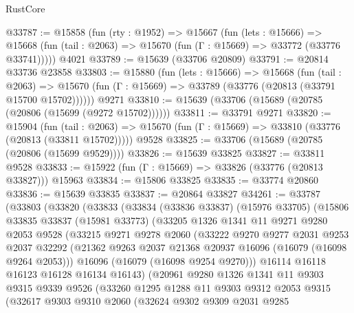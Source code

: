 \begin{lexlean}{RustCore}
\begin{coremodule}
@33787 := @15858
    (fun (rty : @1952) =>
    @15667
      (fun (lets : @15666) =>
      @15668 (fun (tail : @2063) => @15670 (fun (Γ : @15669) => @33772 (@33776 @33741)))))
    @4021
@33789 := @15639 (@33706 @20809)
@33791 := @20814 @33736 @23858
@33803 := @15880
    (fun (lets : @15666) =>
    @15668
      (fun (tail : @2063) =>
      @15670 (fun (Γ : @15669) => @33789 (@33776 (@20813 (@33791 @15700 @15702))))))
    @9271
@33810 := @15639 (@33706 (@15689 (@20785 (@20806 (@15699 (@9272 @15702))))))
@33811 := @33791 @9271
@33820 := @15904
    (fun (tail : @2063) => @15670 (fun (Γ : @15669) => @33810 (@33776 (@20813 (@33811 @15702)))))
    @9528
@33825 := @33706 (@15689 (@20785 (@20806 (@15699 @9529))))
@33826 := @15639 @33825
@33827 := @33811 @9528
@33833 := @15922 (fun (Γ : @15669) => @33826 (@33776 (@20813 @33827))) @15963
@33834 := @15806 @33825
@33835 := @33774 @20860
@33836 := @15639 @33835
@33837 := @20864 @33827
@34261 := @33787
    (@33803
      (@33820
        (@33833
          (@33834
            (@33836 @33837)
            (@15976 @33705)
            (@15806
              @33835
              @33837
              (@15981 @33773)
              (@33205
                @1326
                @1341
                @11
                @9271
                @9280
                @2053
                @9528
                (@33215
                  @9271
                  @9278
                  @2060
                  (@33222
                    @9270
                    @9277
                    @2031
                    @9253
                    @2037
                    @32292
                    (@21362 @9263 @2037 @21368 @20937 @16096 (@16079 (@16098 @9264 @2053)))
                    @16096
                    (@16079 (@16098 @9254 @9270)))
                  @16114
                  @16118
                  @16123
                  @16128
                  @16134
                  @16143)
                (@20961
                  @9280
                  @1326
                  @1341
                  @11
                  @9303
                  @9315
                  @9339
                  @9526
                  (@33260
                    @1295
                    @1288
                    @11
                    @9303
                    @9312
                    @2053
                    @9315
                    (@32617
                      @9303
                      @9310
                      @2060
                      (@32624
                        @9302
                        @9309
                        @2031
                        @9285

\end{coremodule}
\end{lexlean}
